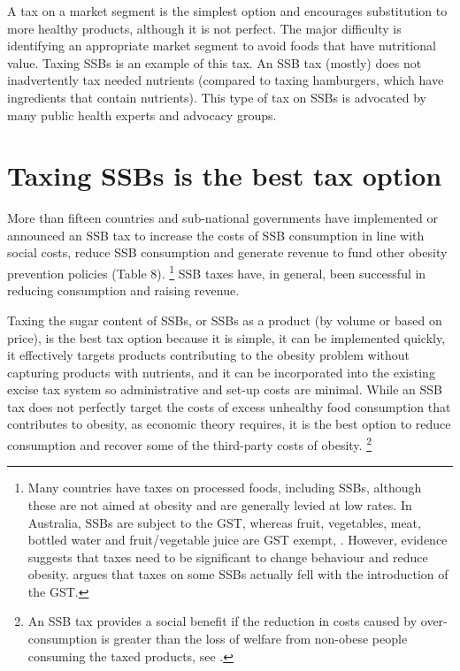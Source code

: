 \documentclass[embargoed]{grattan}
\begin{document}
A tax on a market segment is the simplest option and encourages substitution to more healthy products, although it is not perfect.
The major difficulty is identifying an appropriate market segment to avoid foods that have nutritional value.
Taxing SSBs is an example of this tax.
An SSB tax (mostly) does not inadvertently tax needed nutrients (compared to taxing hamburgers, which have ingredients that contain nutrients).
This type of tax on SSBs is advocated by many public health experts and advocacy groups.

\section{Taxing SSBs is the best tax option }\label{taxing-ssbs-is-the-best-tax-option}

More than fifteen countries and sub-national governments have implemented or announced an SSB tax to increase the costs of SSB consumption in line with social costs, reduce SSB consumption and generate revenue to fund other obesity prevention policies (Table 8).%
\footnote{Many countries have taxes on processed foods, including SSBs, although these are not aimed at obesity and are generally levied at low rates.
In Australia, SSBs are subject to the GST, whereas fruit, vegetables, meat, bottled water and fruit/vegetable juice are GST exempt, \textcite{Office2016GSTstatusfood}.
However, evidence suggests that taxes need to be significant to change behaviour and reduce obesity. \textcite{Australia2014Rethinktaxdiscussion} argues that taxes on some SSBs actually fell with the introduction of the GST.} SSB taxes have, in general, been successful in reducing consumption and raising revenue.

Taxing the sugar content of SSBs, or SSBs as a product (by volume or based on price), is the best tax option because it is simple, it can be implemented quickly, it effectively targets products contributing to the obesity problem without capturing products with nutrients, and it can be incorporated into the existing excise tax system so administrative and set-up costs are minimal.
While an SSB tax does not perfectly target the costs of excess unhealthy food consumption that contributes to obesity, as economic theory requires, it is the best option to reduce consumption and recover some of the third-party costs of obesity.%
\footnote{An SSB tax provides a social benefit if the reduction in costs caused by over-consumption is greater than the loss of welfare from non-obese people consuming the taxed products, see \textcite{CnossenExcisetaxationAustralia}.}
\end{document}
